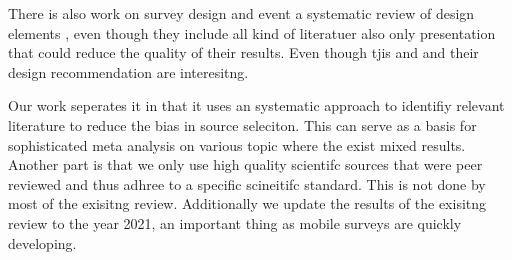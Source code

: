 There is also work on survey design and event a systematic review of design elements \cite{antoun_design_2018}, even though they include all kind of literatuer also only presentation that could reduce the quality of their results. Even though tjis and and their design recommendation are interesitng.


Our work seperates it in that it uses an systematic approach to identifiy relevant literature to reduce the bias in source seleciton. This can serve as a basis for sophisticated meta analysis on various topic where the exist mixed results. Another part is that we only use high quality scientifc sources that were peer reviewed and thus adhree to a specific scineitifc standard. This is not done by most of the exisitng review. Additionally we update the results of the exisitng review to the year 2021, an important thing as mobile surveys are quickly developing. 




